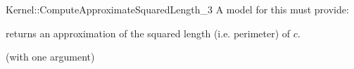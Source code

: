 \begin{ccRefFunctionObjectConcept}{Kernel::ComputeApproximateSquaredLength_3}
A model for this must provide:


       {returns an approximation of the squared length (i.e. perimeter) of $c$. }

\ccRefines
{} (with one argument)

\ccSeeAlso
{}\\

\end{ccRefFunctionObjectConcept}

